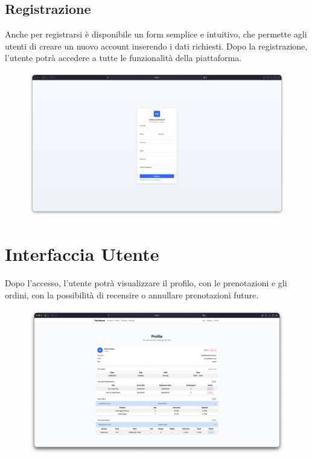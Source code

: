 \documentclass[a4paper,12pt]{report}
\begin{document}
\subsection*{Registrazione}
Anche per registrarsi è disponibile un form semplice e intuitivo, che
permette agli utenti di creare un nuovo
account inserendo i dati richiesti. Dopo la registrazione, l'utente
potrà accedere a tutte le funzionalità della
piattaforma.

\begin{figure}[H]
  \centering
  \includegraphics[width=\textwidth, trim=0 0 0 0]{./img/register.png}
  \vspace{-1em}
  \label{fig:registrazione}
\end{figure}

\newpage
\section{Interfaccia Utente}
Dopo l'accesso, l'utente potrà visualizzare il profilo, con le
prenotazioni e gli ordini, con
la possibilità di recensire o annullare prenotazioni future.

\begin{figure}[H]
  \centering
  \includegraphics[width=\textwidth, trim=0 0 0 0]{./img/users/profile.png}
  \vspace{-1em}
  \label{fig:profile}
\end{figure}
\end{document}

